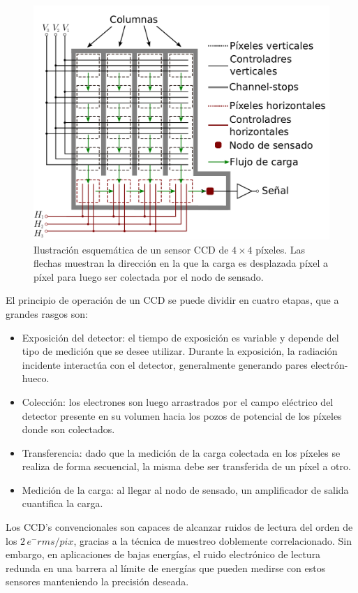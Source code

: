\begin{figure}[h]
    \centering
        \includegraphics[scale=.5]{Figs/ArquitecturaCCD.pdf}
    \caption{Ilustración esquemática de un sensor CCD de $4\times4$ píxeles. Las flechas muestran la dirección en la que la carga es desplazada píxel a píxel para luego ser colectada por el nodo de sensado.}
    \label{fig:ArgquitecturaCCDn}
\end{figure}
El principio de operación de un CCD se puede dividir en cuatro etapas, que a grandes rasgos son:
\begin{itemize}
    \item Exposición del detector: el tiempo de exposición es variable y depende del tipo de medición que se desee utilizar. Durante la exposición, la radiación incidente interactúa con el detector, generalmente generando pares electrón-hueco. 
    \item Colección: los electrones son luego arrastrados por el campo eléctrico del detector presente en su volumen hacia los pozos de potencial de los píxeles donde son colectados.
    \item Transferencia: dado que la medición de la carga colectada en los píxeles se realiza de forma secuencial, la misma debe ser transferida de un píxel a otro.
    \item Medición de la carga: al llegar al nodo de sensado, un amplificador de salida cuantifica la carga.
\end{itemize}
Los CCD's convencionales son capaces de alcanzar ruidos de lectura del orden de los $2\,e^{-}\si{rms/pix}$, gracias a la técnica de muestreo doblemente correlacionado\cite{Tiffenberg}. Sin embargo, en aplicaciones de bajas energías, el ruido electrónico de lectura redunda en una barrera al límite de energías que pueden medirse con estos sensores manteniendo la precisión deseada. 

